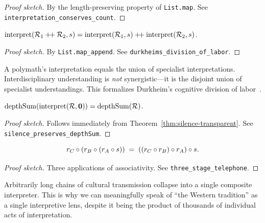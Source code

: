\begin{proof}[Proof sketch]
By the length-preserving property of \texttt{List.map}.
See \texttt{interpretation\_conserves\_count}.
\end{proof}

\begin{theorem}
\label{thm:division-of-labor}
$\operatorname{interpret}(\mathcal{R}_1 \mathbin{+\!+} \mathcal{R}_2, s)
 = \operatorname{interpret}(\mathcal{R}_1, s) \mathbin{+\!+}
   \operatorname{interpret}(\mathcal{R}_2, s)$.
\end{theorem}

\begin{proof}[Proof sketch]
By \texttt{List.map\_append}.  See \texttt{durkheims\_division\_of\_labor}.
\end{proof}

\begin{remark}
A polymath's interpretation equals the union of specialist
interpretations.  Interdisciplinary understanding is \emph{not}
synergistic---it is the disjoint union of specialist understandings.
This formalizes Durkheim's cognitive division of labor~\cite{durkheim1893}.
\end{remark}

\begin{theorem}
\label{thm:silence-depthsum}
$\operatorname{depthSum}(\operatorname{interpret}(\mathcal{R}, \mathbf{0}))
 = \operatorname{depthSum}(\mathcal{R})$.
\end{theorem}

\begin{proof}[Proof sketch]
Follows immediately from Theorem~\ref{thm:silence-transparent}.
See \texttt{silence\_preserves\_depthSum}.
\end{proof}

\begin{theorem}
\label{thm:three-stage}
\[
  r_C \circ (r_B \circ (r_A \circ s))
  \;=\;
  ((r_C \circ r_B) \circ r_A) \circ s.
\]
\end{theorem}

\begin{proof}[Proof sketch]
Three applications of associativity.
See \texttt{three\_stage\_telephone}.
\end{proof}

\begin{remark}
Arbitrarily long chains of cultural transmission collapse into a single
composite interpreter.  This is why we can meaningfully speak of ``the
Western tradition'' as a single interpretive lens, despite it being the
product of thousands of individual acts of interpretation.
\end{remark}

